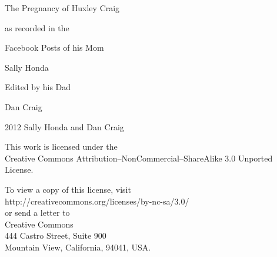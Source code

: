 \documentclass[11pt,ebook]{memoir}
\begin{document}
\frontmatter

\thispagestyle{empty}
\vspace*{1in}
\begin{center}
\end{center}

\cleardoublepage
\thispagestyle{empty}
\vspace*{\fill}
\begin{center}
\par
\vspace{1in}
\LARGE{The Pregnancy of Huxley Craig}\par
\vspace{0.25in}
\large{as recorded in the}\par
\large{Facebook Posts of his Mom}\par
\LARGE{Sally Honda}\par
\vspace{1in}
\large{Edited by his Dad}\par
\LARGE{Dan Craig}
\end{center}
\vspace*{\fill}
\clearpage

\begingroup
\vspace*{\fill}
\footnotesize
\setlength{\parindent}{0pt}
\setlength{\parskip}{\baselineskip}
\textcopyright{} 2012 Sally Honda and Dan Craig

This work is licensed under the\\
Creative Commons Attribution--NonCommercial--ShareAlike 3.0 Unported License.

To view a copy of this license, visit \\
http://creativecommons.org/licenses/by-nc-sa/3.0/\\
or send a letter to\\
Creative Commons\\
444 Castro Street, Suite 900\\
Mountain View, California, 94041, USA.
\vspace*{\fill}
\endgroup
\clearpage

\tableofcontents
\thispagestyle{empty}
\cleardoublepage

\mainmatter

\setcounter{page}{1}
\thispagestyle{cleared}
\end{document}
